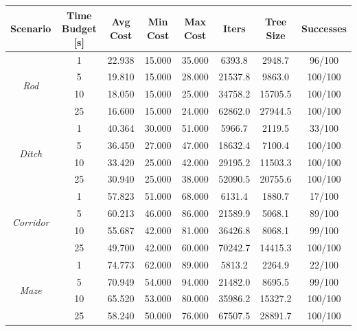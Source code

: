 \begin{table}
    \centering
    \scriptsize
    \begin{tabular}{*{8}{c}}
         Scenario & Time Budget [s] & Avg Cost & Min Cost & Max Cost & Iters & Tree Size & Successes \\
        \hline
        \multirow{4}{*}{\textit{Rod}} & 1 & 22.938 & 15.000 & 35.000 & 6393.8 & 2948.7 & 96/100 \\
         & 5 & 19.810 & 15.000 & 28.000 & 21537.8 & 9863.0 & 100/100 \\
         & 10 & 18.050 & 15.000 & 25.000 & 34758.2 & 15705.5 & 100/100 \\
         & 25 & 16.600 & 15.000 & 24.000 & 62862.0 & 27944.5 & 100/100 \\
        
        \hline                                                          
        \multirow{4}{*}{\textit{Ditch}} & 1 & 40.364 & 30.000 & 51.000 & 5966.7 & 2119.5 & 33/100 \\
         & 5 & 36.450 & 27.000 & 47.000 & 18632.4 & 7100.4 & 100/100 \\
         & 10 & 33.420 & 25.000 & 42.000 & 29195.2 & 11503.3 & 100/100 \\
         & 25 & 30.940 & 25.000 & 38.000 & 52090.5 & 20755.6 & 100/100 \\  
        
        \hline                                                            
        \multirow{4}{*}{\textit{Corridor}} & 1 & 57.823 & 51.000 & 68.000 & 6131.4 & 1880.7 & 17/100 \\
         & 5 & 60.213 & 46.000 & 86.000 & 21589.9 & 5068.1 & 89/100 \\
         & 10 & 55.687 & 42.000 & 81.000 & 36426.8 & 8068.1 & 99/100 \\
         & 25 & 49.700 & 42.000 & 60.000 & 70242.7 & 14415.3 & 100/100 \\    

        \hline                                                                      
        \multirow{4}{*}{\textit{Maze}} & 1 & 74.773 & 62.000 & 89.000 & 5813.2 & 2264.9 & 22/100 \\
         & 5 & 70.949 & 54.000 & 94.000 & 21482.0 & 8695.5 & 99/100 \\
         & 10 & 65.520 & 53.000 & 80.000 & 35986.2 & 15327.2 & 100/100 \\
         & 25 & 58.240 & 50.000 & 76.000 & 67507.5 & 28891.7 & 100/100 \\ 


\end{tabular}
\end{table}
